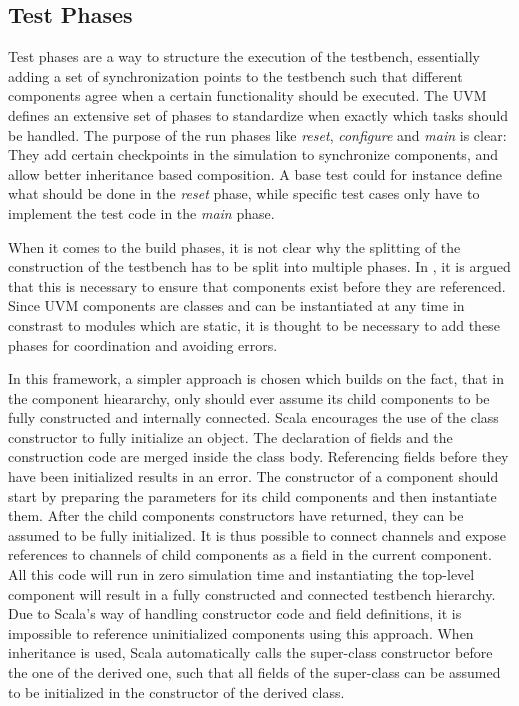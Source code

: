 \documentclass[11pt,a4paper]{report}
\begin{document}
\subsection{Test Phases} %

Test phases are a way to structure the execution of the testbench, essentially adding a set of synchronization points
to the testbench such that different components agree when a certain functionality should be executed. The UVM
defines an extensive set of phases to standardize when exactly which tasks should be handled. The purpose of the run
phases like \textit{reset}, \textit{configure} and \textit{main} is clear: They add certain checkpoints in the
simulation to synchronize components, and allow better inheritance based composition. A base test could for instance
define what should be done in the \textit{reset} phase, while specific test cases only have to implement the test
code in the \textit{main} phase.

When it comes to the build phases, it is not clear why the splitting of the construction of the testbench has to be
split into multiple phases. In \cite{uvm_phases}, it is argued that this is necessary to ensure that components exist
before they are referenced. Since UVM components are classes and can be instantiated at any time in constrast to
modules which are static, it is thought to be necessary to add these phases for coordination and avoiding errors.

In this framework, a simpler approach is chosen which builds on the fact, that in the component hieararchy, only
should ever assume its child components to be fully constructed and internally connected. Scala encourages the use of
the class constructor to fully initialize an object. The declaration of fields and the construction code are merged
inside the class body. Referencing fields before they have been initialized results in an error. The constructor of a
component should start by preparing the parameters for its child components and then instantiate them. After the
child components constructors have returned, they can be assumed to be fully initialized. It is thus possible to
connect channels and expose references to channels of child components as a field in the current component. All this
code will run in zero simulation time and instantiating the top-level component will result in a fully constructed
and connected testbench hierarchy. Due to Scala's way of handling constructor code and field definitions, it is
impossible to reference uninitialized components using this approach. When inheritance is used, Scala automatically
calls the super-class constructor before the one of the derived one, such that all fields of the super-class can be
assumed to be initialized in the constructor of the derived class.
\end{document}
